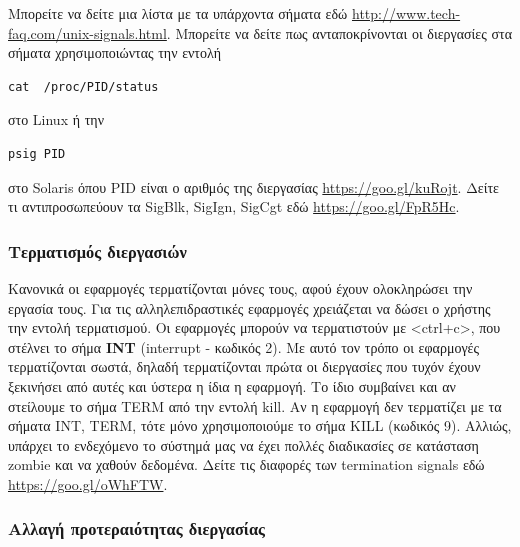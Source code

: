 Μπορείτε να δείτε μια λίστα με τα υπάρχοντα σήματα εδώ
\href{http://www.tech-faq.com/unix-signals.html}{http://www.tech-faq.com/unix-signals.html}.
Μπορείτε να δείτε πως ανταποκρίνονται οι διεργασίες στα σήματα χρησιμοποιώντας την εντολή
\begin{lstlisting}
cat  /proc/PID/status
\end{lstlisting}
στο Linux ή την 
\begin{lstlisting}
psig PID
\end{lstlisting}
στο Solaris όπου PID είναι ο αριθμός της διεργασίας \href{https://goo.gl/kuRojt}{https://goo.gl/kuRojt}. Δείτε τι αντιπροσωπεύουν τα {\ttfamily SigBlk, SigIgn, SigCgt} εδώ \href{https://goo.gl/FpR5Hc}{https://goo.gl/FpR5Hc}.


\subsubsection{Τερματισμός διεργασιών}

Κανονικά οι εφαρμογές τερματίζονται μόνες τους, αφού έχουν ολοκληρώσει την εργασία τους. Για τις αλληλεπιδραστικές εφαρμογές χρειάζεται να
δώσει ο χρήστης την εντολή τερματισμού. Οι εφαρμογές μπορούν να τερματιστούν με <ctrl+c>, που στέλνει το σήμα \textbf{INT}
(interrupt - κωδικός 2). Με αυτό τον τρόπο οι εφαρμογές τερματίζονται σωστά, δηλαδή τερματίζονται πρώτα οι διεργασίες που τυχόν έχουν
ξεκινήσει από
αυτές και ύστερα η ίδια η εφαρμογή. Το ίδιο συμβαίνει και αν στείλουμε το σήμα TERM από την εντολή kill. Αν η εφαρμογή δεν τερματίζει με τα
σήματα INT, TERM, τότε μόνο χρησιμοποιούμε το σήμα KILL (κωδικός 9). Αλλιώς, υπάρχει το ενδεχόμενο το σύστημά μας να έχει πολλές διαδικασίες σε κατάσταση zombie και να χαθούν δεδομένα. Δείτε τις διαφορές των termination signals εδώ \href{https://goo.gl/oWhFTW}{https://goo.gl/oWhFTW}.

\subsubsection{Αλλαγή προτεραιότητας διεργασίας}

